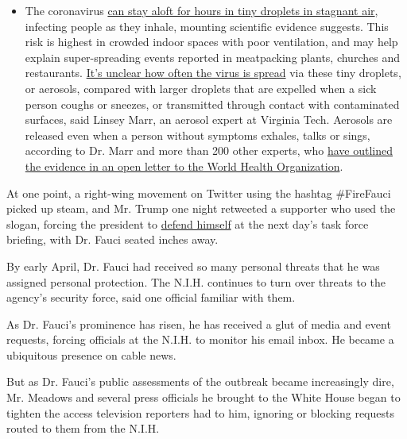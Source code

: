 \begin{itemize}
  \begin{itemize}
  \tightlist
  \item
    The coronavirus
    \href{https://www.nytimes.com/2020/07/04/health/239-experts-with-one-big-claim-the-coronavirus-is-airborne.html?action=click\&pgtype=Article\&state=default\&region=MAIN_CONTENT_3\&context=storylines_faq}{can
    stay aloft for hours in tiny droplets in stagnant air}, infecting
    people as they inhale, mounting scientific evidence suggests. This
    risk is highest in crowded indoor spaces with poor ventilation, and
    may help explain super-spreading events reported in meatpacking
    plants, churches and restaurants.
    \href{https://www.nytimes.com/2020/07/06/health/coronavirus-airborne-aerosols.html?action=click\&pgtype=Article\&state=default\&region=MAIN_CONTENT_3\&context=storylines_faq}{It's
    unclear how often the virus is spread} via these tiny droplets, or
    aerosols, compared with larger droplets that are expelled when a
    sick person coughs or sneezes, or transmitted through contact with
    contaminated surfaces, said Linsey Marr, an aerosol expert at
    Virginia Tech. Aerosols are released even when a person without
    symptoms exhales, talks or sings, according to Dr. Marr and more
    than 200 other experts, who
    \href{https://academic.oup.com/cid/article/doi/10.1093/cid/ciaa939/5867798}{have
    outlined the evidence in an open letter to the World Health
    Organization}.
  \end{itemize}
\end{itemize}

At one point, a right-wing movement on Twitter using the hashtag
\#FireFauci picked up steam, and Mr. Trump one night retweeted a
supporter who used the slogan, forcing the president to
\href{https://www.nytimes.com/2020/04/13/us/politics/coronavirus-trump-fauci.html}{defend
himself} at the next day's task force briefing, with Dr. Fauci seated
inches away.

By early April, Dr. Fauci had received so many personal threats that he
was assigned personal protection. The N.I.H. continues to turn over
threats to the agency's security force, said one official familiar with
them.

As Dr. Fauci's prominence has risen, he has received a glut of media and
event requests, forcing officials at the N.I.H. to monitor his email
inbox. He became a ubiquitous presence on cable news.

But as Dr. Fauci's public assessments of the outbreak became
increasingly dire, Mr. Meadows and several press officials he brought to
the White House began to tighten the access television reporters had to
him, ignoring or blocking requests routed to them from the N.I.H.

